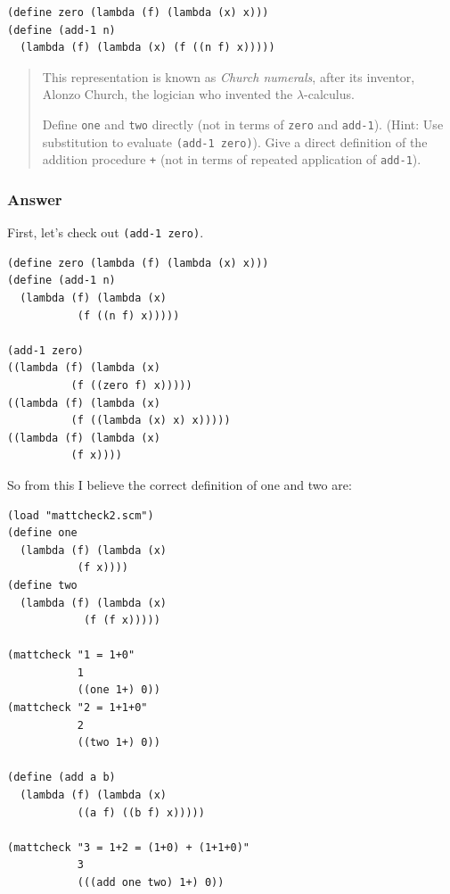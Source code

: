\documentclass[final,fleqn,titlepage,twoside]{article}
\begin{document}
\begin{verbatim}
(define zero (lambda (f) (lambda (x) x)))
(define (add-1 n)
  (lambda (f) (lambda (x) (f ((n f) x)))))
\end{verbatim}

\begin{quote}
This representation is known as \emph{Church numerals}, after its inventor, Alonzo
Church, the logician who invented the \(\lambda\)-calculus.

Define \texttt{one} and \texttt{two} directly (not in terms of
\texttt{zero} and \texttt{add-1}). (Hint: Use substitution to evaluate
\texttt{(add-1 zero)}). Give a direct definition of the addition procedure
\texttt{+} (not in terms of repeated application of \texttt{add-1}).
\end{quote}

\subsubsection{Answer}
\label{sec:org8c3f16e}
First, let's check out \texttt{(add-1 zero)}.
\begin{verbatim}
(define zero (lambda (f) (lambda (x) x)))
(define (add-1 n)
  (lambda (f) (lambda (x)
           (f ((n f) x)))))

(add-1 zero)
((lambda (f) (lambda (x)
          (f ((zero f) x)))))
((lambda (f) (lambda (x)
          (f ((lambda (x) x) x)))))
((lambda (f) (lambda (x)
          (f x))))
\end{verbatim}

So from this I believe the correct definition of one and two are:
\begin{verbatim}
(load "mattcheck2.scm")
(define one
  (lambda (f) (lambda (x)
           (f x))))
(define two
  (lambda (f) (lambda (x)
            (f (f x)))))

(mattcheck "1 = 1+0"
           1
           ((one 1+) 0))
(mattcheck "2 = 1+1+0"
           2
           ((two 1+) 0))

(define (add a b)
  (lambda (f) (lambda (x)
           ((a f) ((b f) x)))))

(mattcheck "3 = 1+2 = (1+0) + (1+1+0)"
           3
           (((add one two) 1+) 0))
\end{verbatim}
\end{document}
